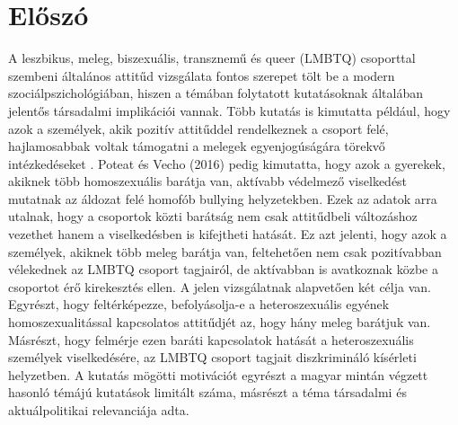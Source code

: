 \section{Előszó}
A leszbikus, meleg, biszexuális, transznemű és queer (LMBTQ) csoporttal szembeni általános attitűd vizsgálata fontos szerepet tölt be a modern szociálpszichológiában, hiszen a témában folytatott kutatásoknak általában jelentős társadalmi implikációi vannak. Több kutatás is kimutatta például, hogy azok a személyek, akik pozitív attitűddel rendelkeznek a csoport felé, hajlamosabbak voltak támogatni a melegek egyenjogúságára törekvő intézkedéseket \parencite{dasgupta_rivera_2008}.  Poteat és Vecho (2016) pedig kimutatta, hogy azok a gyerekek, akiknek több homoszexuális barátja van, aktívabb védelmező viselkedést mutatnak az áldozat felé homofób bullying helyzetekben. Ezek az adatok arra utalnak, hogy a csoportok közti barátság nem csak attitűdbeli változáshoz vezethet hanem a viselkedésben is kifejtheti hatását. Ez azt jelenti, hogy azok a személyek, akiknek több meleg barátja van, feltehetően nem csak pozitívabban vélekednek az LMBTQ csoport tagjairól, de aktívabban is avatkoznak közbe a csoportot érő kirekesztés ellen.  
A jelen vizsgálatnak alapvetően két célja van. Egyrészt, hogy feltérképezze, befolyásolja-e a heteroszexuális egyének homoszexualitással kapcsolatos attitűdjét az, hogy hány meleg barátjuk van. Másrészt, hogy felmérje ezen baráti kapcsolatok hatását a heteroszexuális személyek viselkedésére, az LMBTQ csoport tagjait diszkrimináló kísérleti helyzetben. A kutatás mögötti motivációt egyrészt a magyar mintán végzett hasonló témájú kutatások limitált száma, másrészt a téma társadalmi és aktuálpolitikai relevanciája adta. 
\pagebreak
